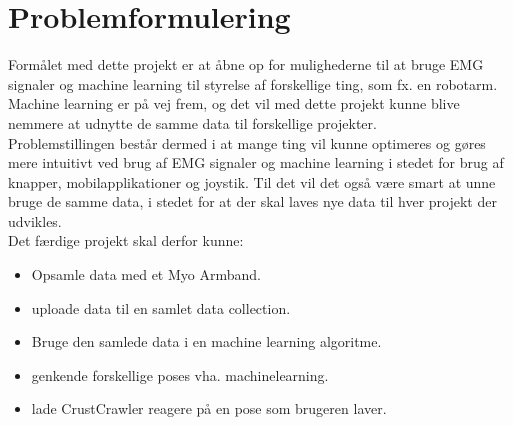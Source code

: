 \thispagestyle{fancy}
\chapter{Problemformulering}
\label{chp:problemformulering}

Formålet med dette projekt er at åbne op for mulighederne til at bruge EMG signaler og machine learning til styrelse af forskellige ting, som fx. en robotarm. Machine learning er på vej frem, og det vil med dette projekt kunne blive nemmere at udnytte de samme data til forskellige projekter.\\

Problemstillingen består dermed i at mange ting vil kunne optimeres og gøres mere intuitivt ved brug af EMG signaler og machine learning i stedet for brug af knapper, mobilapplikationer og joystik. Til det vil det også være smart at unne bruge de samme data, i stedet for at der skal laves nye data til hver projekt der udvikles.\\

Det færdige projekt skal derfor kunne:
\begin{itemize}
	\item Opsamle data med et Myo Armband.
	\item uploade data til en samlet data collection.
	\item Bruge den samlede data i en machine learning algoritme.
	\item genkende forskellige poses vha. machinelearning.
	\item lade CrustCrawler reagere på en pose som brugeren laver.
\end{itemize}

